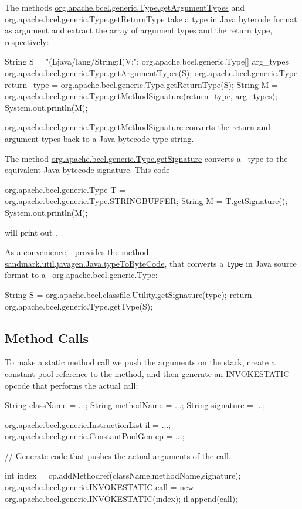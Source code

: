 The methods \url{org.apache.bcel.generic.Type.getArgumentTypes}
and \url{org.apache.bcel.generic.Type.getReturnType} take
a type in Java bytecode format as argument and extract the
array of argument types and the return type, respectively:
\begin{listing}{1}
    String S = "(Ljava/lang/String;I)V;";
    org.apache.bcel.generic.Type[] arg_types =
       org.apache.bcel.generic.Type.getArgumentTypes(S);
    org.apache.bcel.generic.Type return_type =
       org.apache.bcel.generic.Type.getReturnType(S);
    String M = org.apache.bcel.generic.Type.getMethodSignature(return_type, arg_types);
    System.out.println(M);
\end{listing}
\url{org.apache.bcel.generic.Type.getMethodSignature} converts
the return and argument types back to a Java bytecode type string.

The method \url{org.apache.bcel.generic.Type.getSignature}
converts a \BCEL\ type to the equivalent Java bytecode 
signature. This code
\begin{listing}{1}
    org.apache.bcel.generic.Type T =
       org.apache.bcel.generic.Type.STRINGBUFFER;
    String M = T.getSignature();
    System.out.println(M);
\end{listing}
will print out .

As a convenience, \SM\ provides the method
\url{sandmark.util.javagen.Java.typeToByteCode},
that converts a {\tt type} in Java source format
to a \BCEL\ \url{org.apache.bcel.generic.Type}:
\begin{listing}{1}
   String S = org.apache.bcel.classfile.Utility.getSignature(type);
   return org.apache.bcel.generic.Type.getType(S);
\end{listing}


\subsection{Method Calls}
To make a static method call we push the arguments 
on the stack, create a constant pool reference to
the method, and then generate an \url{INVOKESTATIC}
opcode that performs the actual call:
\begin{listing}{1}
   String className  = ...;
   String methodName = ...;
   String signature  = ...;

   org.apache.bcel.generic.InstructionList il = ...;
   org.apache.bcel.generic.ConstantPoolGen cp = ...;

   // Generate code that pushes the actual arguments of the call.

   int index = cp.addMethodref(className,methodName,signature);
   org.apache.bcel.generic.INVOKESTATIC call = 
       new org.apache.bcel.generic.INVOKESTATIC(index);
   il.append(call);
\end{listing}

